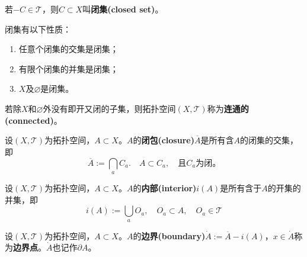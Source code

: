 \documentclass[a4paper]{article}
\begin{document}
\begin{ndefi}
    若$ -C \in \mathcal{T} $，则$ C \subset X $叫\textbf{闭集(closed set)}。
\end{ndefi}

\begin{nthm}
    闭集有以下性质：
    \begin{enumerate}
        \item 任意个闭集的交集是闭集；
        \item 有限个闭集的并集是闭集；
        \item $ X $及$ \varnothing $是闭集。
    \end{enumerate}
\end{nthm}

\begin{ndefi}
    若除$ X $和$ \varnothing $外没有即开又闭的子集，则拓扑空间$ (X, \mathcal{T}) $称为\textbf{连通的(connected)}。
\end{ndefi}

\begin{ndefi}
    设$ (X, \mathcal{T}) $为拓扑空间，$ A \subset X $。$ A $的\textbf{闭包(closure)}$ \overline{A} $是所有含$ A $的闭集的交集，即
    \begin{equation*}
        \overline{A} := \bigcap_{a} C_{a}. \quad A \subset C_{a}, \quad \text{且} C_{a} \text{为闭。}
    \end{equation*}
\end{ndefi}

\begin{ndefi}
    设$ (X, \mathcal{T}) $为拓扑空间，$ A \subset X $。$ A $的\textbf{内部(interior)}$ i(A) $是所有含于$ A $的开集的并集，即
    \begin{equation*}
        i(A) := \bigcup_{a} O_{a}, \quad O_{a} \subset A, \quad O_{a} \in \mathcal{T}
    \end{equation*}
\end{ndefi}

\begin{ndefi}
    设$ (X, \mathcal{T}) $为拓扑空间，$ A \subset X $。$ A $的\textbf{边界(boundary)}$ \dot{A} := \overline{A} - i(A) $，$ x \in \dot{A} $称为\textbf{边界点}。$ \dot{A} $也记作$ \partial A $。
\end{ndefi}
\end{document}
